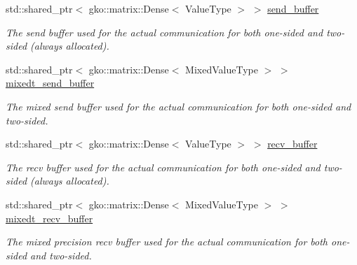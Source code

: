 \begin{DoxyCompactItemize}
std\+::shared\+\_\+ptr$<$ gko\+::matrix\+::\+Dense$<$ Value\+Type $>$ $>$ \hyperlink{structschwz_1_1Communicate_1_1comm__struct_afc441e718856c45bd3cc462780886ca8}{send\+\_\+buffer}
\begin{DoxyCompactList}\small\item\em The send buffer used for the actual communication for both one-\/sided and two-\/sided (always allocated). \end{DoxyCompactList}\item 
\mbox{\label{structschwz_1_1Communicate_1_1comm__struct_a357d96eeeb734a275f78782e7e6542a8}} 
std\+::shared\+\_\+ptr$<$ gko\+::matrix\+::\+Dense$<$ Mixed\+Value\+Type $>$ $>$ \hyperlink{structschwz_1_1Communicate_1_1comm__struct_a357d96eeeb734a275f78782e7e6542a8}{mixedt\+\_\+send\+\_\+buffer}
\begin{DoxyCompactList}\small\item\em The mixed send buffer used for the actual communication for both one-\/sided and two-\/sided. \end{DoxyCompactList}\item 
\mbox{\label{structschwz_1_1Communicate_1_1comm__struct_a7b02126d598b9054b9adf0ebc9b3138c}} 
std\+::shared\+\_\+ptr$<$ gko\+::matrix\+::\+Dense$<$ Value\+Type $>$ $>$ \hyperlink{structschwz_1_1Communicate_1_1comm__struct_a7b02126d598b9054b9adf0ebc9b3138c}{recv\+\_\+buffer}
\begin{DoxyCompactList}\small\item\em The recv buffer used for the actual communication for both one-\/sided and two-\/sided (always allocated). \end{DoxyCompactList}\item 
\mbox{\label{structschwz_1_1Communicate_1_1comm__struct_a93ca78673122ad09e24bebd0b1ec9750}} 
std\+::shared\+\_\+ptr$<$ gko\+::matrix\+::\+Dense$<$ Mixed\+Value\+Type $>$ $>$ \hyperlink{structschwz_1_1Communicate_1_1comm__struct_a93ca78673122ad09e24bebd0b1ec9750}{mixedt\+\_\+recv\+\_\+buffer}
\begin{DoxyCompactList}\small\item\em The mixed precision recv buffer used for the actual communication for both one-\/sided and two-\/sided. \end{DoxyCompactList}\item 

\end{DoxyCompactItemize}
